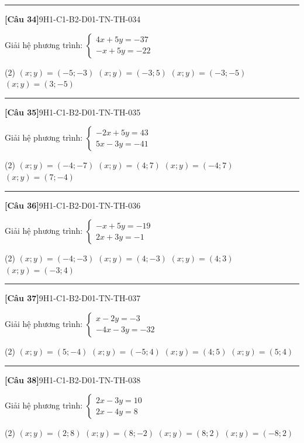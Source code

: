 \documentclass[12pt,a4paper]{article}
\newif\ifloigiai
\newenvironment{cauhoi}[2]{%
  \par\medskip\noindent\rule{\textwidth}{0.4pt}\par\nopagebreak
  \noindent\textbf{[#1]}\hfill{\scriptsize\ttfamily #2}\par\nopagebreak\smallskip}{\par}
\newcommand{\dapan}[1]{\ifloigiai\par\smallskip\noindent\textit{Đáp án:} \textbf{#1}\par\fi}
\begin{document}
\begin{cauhoi}{Câu 34}{9H1-C1-B2-D01-TN-TH-034}
Giải hệ phương trình: $\begin{cases}4x + 5y=-37\\ -x + 5y=-22\end{cases}$
\begin{tasks}(2)
\task $(x;y)=(-5;-3)$
\task $(x;y)=(-3;5)$
\task $(x;y)=(-3;-5)$
\task $(x;y)=(3;-5)$
\end{tasks}
\dapan{C}
\end{cauhoi}
\begin{cauhoi}{Câu 35}{9H1-C1-B2-D01-TN-TH-035}
Giải hệ phương trình: $\begin{cases}-2x + 5y=43\\ 5x - 3y=-41\end{cases}$
\begin{tasks}(2)
\task $(x;y)=(-4;-7)$
\task $(x;y)=(4;7)$
\task $(x;y)=(-4;7)$
\task $(x;y)=(7;-4)$
\end{tasks}
\dapan{C}
\end{cauhoi}
\begin{cauhoi}{Câu 36}{9H1-C1-B2-D01-TN-TH-036}
Giải hệ phương trình: $\begin{cases}-x + 5y=-19\\ 2x + 3y=-1\end{cases}$
\begin{tasks}(2)
\task $(x;y)=(-4;-3)$
\task $(x;y)=(4;-3)$
\task $(x;y)=(4;3)$
\task $(x;y)=(-3;4)$
\end{tasks}
\dapan{B}
\end{cauhoi}
\begin{cauhoi}{Câu 37}{9H1-C1-B2-D01-TN-TH-037}
Giải hệ phương trình: $\begin{cases}x - 2y=-3\\ -4x - 3y=-32\end{cases}$
\begin{tasks}(2)
\task $(x;y)=(5;-4)$
\task $(x;y)=(-5;4)$
\task $(x;y)=(4;5)$
\task $(x;y)=(5;4)$
\end{tasks}
\dapan{D}
\end{cauhoi}
\begin{cauhoi}{Câu 38}{9H1-C1-B2-D01-TN-TH-038}
Giải hệ phương trình: $\begin{cases}2x - 3y=10\\ 2x - 4y=8\end{cases}$
\begin{tasks}(2)
\task $(x;y)=(2;8)$
\task $(x;y)=(8;-2)$
\task $(x;y)=(8;2)$
\task $(x;y)=(-8;2)$
\end{tasks}
\dapan{C}
\end{cauhoi}
\end{document}
